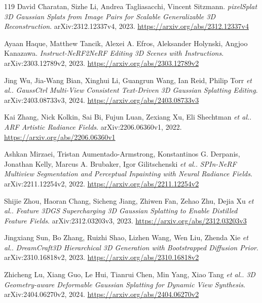 \documentclass[11pt,a4paper]{article}
\begin{document}
\begin{thebibliography}{119}
David Charatan, Sizhe Li, Andrea Tagliasacchi, Vincent Sitzmann.
\newblock \emph{pixelSplat 3D Gaussian Splats from Image Pairs for Scalable Generalizable 3D Reconstruction}.
\newblock arXiv:2312.12337v4, 2023.
\newblock \url{https://arxiv.org/abs/2312.12337v4}

Ayaan Haque, Matthew Tancik, Alexei A. Efros, Aleksander Holynski, Angjoo Kanazawa.
\newblock \emph{Instruct-NeRF2NeRF Editing 3D Scenes with Instructions}.
\newblock arXiv:2303.12789v2, 2023.
\newblock \url{https://arxiv.org/abs/2303.12789v2}

Jing Wu, Jia-Wang Bian, Xinghui Li, Guangrun Wang, Ian Reid, Philip Torr \emph{et al.}.
\newblock \emph{GaussCtrl Multi-View Consistent Text-Driven 3D Gaussian Splatting Editing}.
\newblock arXiv:2403.08733v3, 2024.
\newblock \url{https://arxiv.org/abs/2403.08733v3}

Kai Zhang, Nick Kolkin, Sai Bi, Fujun Luan, Zexiang Xu, Eli Shechtman \emph{et al.}.
\newblock \emph{ARF Artistic Radiance Fields}.
\newblock arXiv:2206.06360v1, 2022.
\newblock \url{https://arxiv.org/abs/2206.06360v1}

Ashkan Mirzaei, Tristan Aumentado-Armstrong, Konstantinos G. Derpanis, Jonathan Kelly, Marcus A. Brubaker, Igor Gilitschenski \emph{et al.}.
\newblock \emph{SPIn-NeRF Multiview Segmentation and Perceptual Inpainting with Neural Radiance Fields}.
\newblock arXiv:2211.12254v2, 2022.
\newblock \url{https://arxiv.org/abs/2211.12254v2}

Shijie Zhou, Haoran Chang, Sicheng Jiang, Zhiwen Fan, Zehao Zhu, Dejia Xu \emph{et al.}.
\newblock \emph{Feature 3DGS Supercharging 3D Gaussian Splatting to Enable Distilled Feature Fields}.
\newblock arXiv:2312.03203v3, 2023.
\newblock \url{https://arxiv.org/abs/2312.03203v3}

Jingxiang Sun, Bo Zhang, Ruizhi Shao, Lizhen Wang, Wen Liu, Zhenda Xie \emph{et al.}.
\newblock \emph{DreamCraft3D Hierarchical 3D Generation with Bootstrapped Diffusion Prior}.
\newblock arXiv:2310.16818v2, 2023.
\newblock \url{https://arxiv.org/abs/2310.16818v2}

Zhicheng Lu, Xiang Guo, Le Hui, Tianrui Chen, Min Yang, Xiao Tang \emph{et al.}.
\newblock \emph{3D Geometry-aware Deformable Gaussian Splatting for Dynamic View Synthesis}.
\newblock arXiv:2404.06270v2, 2024.
\newblock \url{https://arxiv.org/abs/2404.06270v2}


\end{thebibliography}
\end{document}
